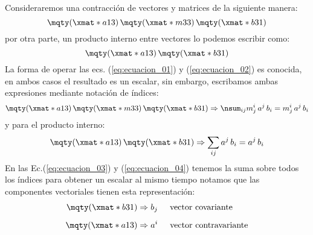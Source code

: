 Consideraremos una contracción de vectores y matrices de la siguiente manera:
\begin{equation}
\mqty(\xmat*{a}{1}{3}) \, \mqty(\xmat*{m}{3}{3}) \, \mqty(\xmat*{b}{3}{1})
\label{eq:ecuacion_01}
\end{equation}
por otra parte, un producto interno entre vectores lo podemos escribir como:
\begin{equation}
\mqty(\xmat*{a}{1}{3}) \, \mqty(\xmat*{b}{3}{1})
\label{eq:ecuacion_02}
\end{equation}
La forma de operar las ecs. (\ref{eq:ecuacion_01}) y (\ref{eq:ecuacion_02}) es conocida, en ambos casos el resultado es un escalar, sin embargo, escribamos ambas expresiones mediante notación de índices:
\begin{equation}
\mqty(\xmat*{a}{1}{3}) \, \mqty(\xmat*{m}{3}{3}) \, \mqty(\xmat*{b}{3}{1})
\Rightarrow \nsum_{ij} m_{j}^{i} \, a^{j} \, b_{i} = m_{j}^{i} \, a^{j} \, b_{i} 
\label{eq:ecuacion_03}
\end{equation}
y para el producto interno:
\begin{equation}
\mqty(\xmat*{a}{1}{3}) \, \mqty(\xmat*{b}{3}{1})
 \Rightarrow \sum_{ij} a^{j} \, b_{i} = a^{j} \, b_{i}
\label{eq:ecuacion_04}
\end{equation}
En las Ec.(\ref{eq:ecuacion_03}) y (\ref{eq:ecuacion_04}) tenemos la suma sobre todos los índices para obtener un escalar al mismo tiempo notamos que las componentes vectoriales tienen esta representación:
\begin{align}
\begin{aligned}
\mqty(\xmat*{b}{3}{1})
&\Rightarrow b_{j} \hspace{0.5cm} \mbox{vector covariante}
\\[0.5em]
\mqty(\xmat*{a}{1}{3})
&\Rightarrow a^{i} \hspace{0.5cm} \mbox{vector contravariante}
\end{aligned}
\label{eq:ecuacion_05}
\end{align}
